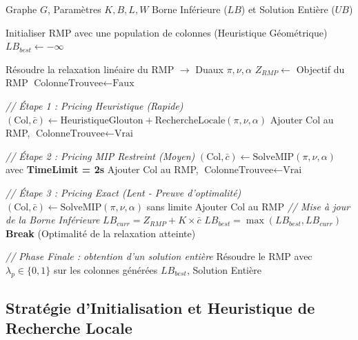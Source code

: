\documentclass{article}
\begin{document}
\begin{algorithm}[H]
\caption{Génération de Colonnes avec Pricing Hybride}
\begin{algorithmic}[1]
\REQUIRE Graphe $G$, Paramètres $K, B, L, W$
\ENSURE Borne Inférieure ($LB$) et Solution Entière ($UB$)

\STATE Initialiser RMP avec une population de colonnes (Heuristique Géométrique)
\STATE $LB_{best} \leftarrow -\infty$

    \STATE Résoudre la relaxation linéaire du RMP $\to$ Duaux $\pi, \nu, \alpha$
    \STATE $Z_{RMP} \leftarrow$ Objectif du RMP
    \STATE $\text{ColonneTrouvee} \leftarrow \text{Faux}$

    \STATE \textit{// Étape 1 : Pricing Heuristique (Rapide)}
    \STATE $(\text{Col}, \bar{c}) \leftarrow \text{HeuristiqueGlouton} + \text{RechercheLocale}(\pi, \nu, \alpha)$
        \STATE Ajouter Col au RMP, $\text{ColonneTrouvee} \leftarrow \text{Vrai}$
    \ENDIF

        \STATE \textit{// Étape 2 : Pricing MIP Restreint (Moyen)}
        \STATE $(\text{Col}, \bar{c}) \leftarrow \text{SolveMIP}(\pi, \nu, \alpha)$ avec \textbf{TimeLimit = 2s}
            \STATE Ajouter Col au RMP, $\text{ColonneTrouvee} \leftarrow \text{Vrai}$
        \ENDIF
    \ENDIF

        \STATE \textit{// Étape 3 : Pricing Exact (Lent - Preuve d'optimalité)}
        \STATE $(\text{Col}, \bar{c}) \leftarrow \text{SolveMIP}(\pi, \nu, \alpha)$ sans limite
            \STATE Ajouter Col au RMP
                \STATE \textit{// Mise à jour de la Borne Inférieure}
                \STATE $LB_{curr} = Z_{RMP} + K \times \bar{c}$
                \STATE $LB_{best} = \max(LB_{best}, LB_{curr})$
        \ELSE
            \STATE \textbf{Break} (Optimalité de la relaxation atteinte)
        \ENDIF
    \ENDIF
    
\ENDWHILE

\STATE \textit{// Phase Finale : obtention d'un solution entière}
\STATE Résoudre le RMP avec $\lambda_p \in \{0,1\}$ sur les colonnes générées
\RETURN $LB_{best}$, Solution Entière
\end{algorithmic}
\end{algorithm}

\subsection{Stratégie d'Initialisation et Heuristique de Recherche Locale}
\end{document}
